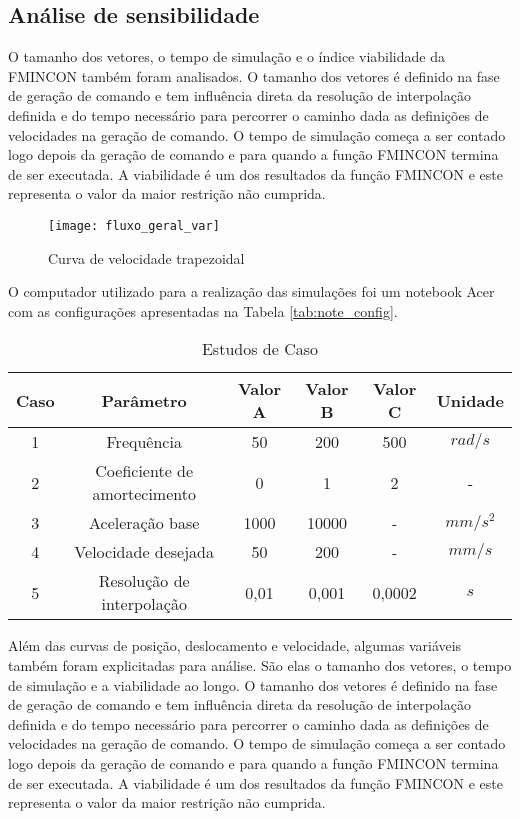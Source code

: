\subsection{Análise de sensibilidade}

O tamanho dos vetores, o tempo de simulação e o índice viabilidade da FMINCON também foram analisados. O tamanho dos vetores é definido na fase de geração de comando e tem influência direta da resolução de interpolação definida e do tempo necessário para percorrer o caminho dada as definições de velocidades na geração de comando. O tempo de simulação começa a ser contado logo depois da geração de comando e para quando a função FMINCON termina de ser executada. A viabilidade é um dos resultados da função FMINCON e este representa o valor da maior restrição não cumprida.

\begin{figure}[H]
    \centering
    \caption{Curva de velocidade trapezoidal}
    \texttt{[image: fluxo\_geral\_var]}

    \label{fig:fluxo_geral_var}
\end{figure}

O computador utilizado para a realização das simulações foi um notebook Acer com as configurações apresentadas na Tabela
\ref{tab:note_config}.

\begin{table}
    \begin{center}
    \caption{Estudos de Caso}
    \label{tab:sim_params}
    \begin{tabular}{c c c c c c}
        Caso & Parâmetro & Valor A & Valor B & Valor C & Unidade\\ \hline
        1 & Frequência & 50 & 200 & 500 & $rad/s$\\
        2 & Coeficiente de amortecimento & 0 & 1 & 2 & - \\
        3 & Aceleração base & 1000 & 10000 & - & $mm/s^2$ \\
        4 & Velocidade desejada & 50 & 200 & - & $mm/s$ \\
        5 & Resolução de interpolação & 0,01 & 0,001 & 0,0002 & $s$ \\ \hline
    \end{tabular}
    \end{center}
\end{table}


Além das curvas de posição, deslocamento e velocidade, algumas variáveis também foram explicitadas para análise. São elas o tamanho dos vetores, o tempo de simulação e a viabilidade ao longo. O tamanho dos vetores é definido na fase de geração de comando e tem influência direta da resolução de interpolação definida e do tempo necessário para percorrer o caminho dada as definições de velocidades na geração de comando. O tempo de simulação começa a ser contado logo depois da geração de comando e para quando a função FMINCON termina de ser executada. A viabilidade é um dos resultados da função FMINCON e este representa o valor da maior restrição não cumprida.

